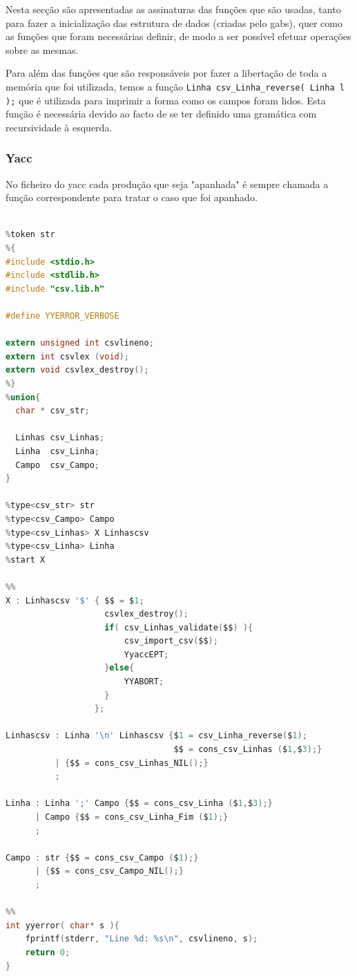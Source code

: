 \documentclass[11pt, a4paper, oneside]{article}
\begin{document}
Nesta secção são apresentadas as assinaturas das funções que são usadas, tanto para fazer a inicialização das estrutura de dados (criadas pelo \textsf{gabs}), quer como as funções que foram necessárias definir, de modo a ser possível efetuar operações sobre as mesmas.

Para além das funções que são responsáveis por fazer a libertação de toda a memória que foi utilizada, temos a função \texttt{Linha csv\_Linha\_reverse( Linha l );} que é utilizada para imprimir a forma como os campos foram lidos. Esta função é necessária devido ao facto de se ter definido uma gramática com recursividade à esquerda.

\newpage

\subsubsection{\textsf{Yacc}}
No ficheiro do \textsf{yacc} cada produção que seja "apanhada" é sempre chamada a função correspondente para tratar o caso que foi apanhado.

\begin{lstlisting}[language=C, caption={Yacc do ficheiro de resultados.}]

%token str
%{
#include <stdio.h>
#include <stdlib.h>
#include "csv.lib.h"

#define YYERROR_VERBOSE

extern unsigned int csvlineno;
extern int csvlex (void);
extern void csvlex_destroy();
%}
%union{
  char * csv_str;
  
  Linhas csv_Linhas;
  Linha  csv_Linha;
  Campo  csv_Campo;
} 

%type<csv_str> str
%type<csv_Campo> Campo
%type<csv_Linhas> X Linhascsv
%type<csv_Linha> Linha
%start X

%%
X : Linhascsv '$' { $$ = $1; 
                    csvlex_destroy();
                    if( csv_Linhas_validate($$) ){
                        csv_import_csv($$);
                        YyaccEPT;
                    }else{
                        YYABORT;
                    }
                  };

Linhascsv : Linha '\n' Linhascsv {$1 = csv_Linha_reverse($1);
                                  $$ = cons_csv_Linhas ($1,$3);}
          | {$$ = cons_csv_Linhas_NIL();}
          ;

Linha : Linha ';' Campo {$$ = cons_csv_Linha ($1,$3);}
      | Campo {$$ = cons_csv_Linha_Fim ($1);}
      ;

Campo : str {$$ = cons_csv_Campo ($1);}
      | {$$ = cons_csv_Campo_NIL();}
      ;

%%
int yyerror( char* s ){
    fprintf(stderr, "Line %d: %s\n", csvlineno, s);
    return 0;
}
\end{lstlisting}
\end{document}

